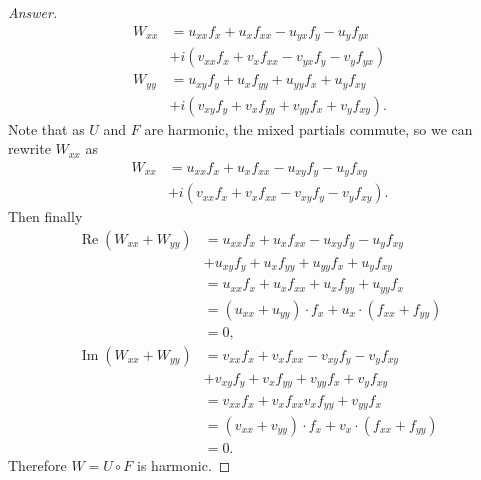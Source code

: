 \documentclass[12pt]{article}
\newcommand\paren[1]{\left( #1 \right)}
\theoremstyle{definition}
\DeclareMathOperator\re{Re}
\DeclareMathOperator\im{Im}
\begin{document}
\begin{proof}[Answer]
\begin{align*}
        W_{xx} & = u_{xx} f_x + u_x f_{xx} - u_{yx} f_y - u_y f_{yx} \\
        & + i \paren{ v_{xx} f_x + v_x f_{xx} - v_{yx} f_y - v_y f_{yx} } \\
        W_{yy} & = u_{xy} f_y + u_x f_{yy} + u_{yy} f_x + u_y f_{xy} \\
        & + i \paren{ v_{xy} f_y + v_x f_{yy} + v_{yy} f_x + v_y f_{xy} }.
    \end{align*}
    Note that as $U$ and $F$ are harmonic, the mixed partials commute, so we can rewrite $W_{xx}$ as
    \begin{align*}
        W_{xx} & = u_{xx} f_x + u_x f_{xx} - u_{xy} f_y - u_y f_{xy} \\
        & + i \paren{ v_{xx} f_x + v_x f_{xx} - v_{xy} f_y - v_y f_{xy} }.
    \end{align*}
    Then finally
    \begin{align*}
        \re \paren{ W_{xx} + W_{yy} } & = u_{xx} f_x + u_x f_{xx} - u_{xy} f_y - u_y f_{xy} \\
        & + u_{xy} f_y + u_x f_{yy} + u_{yy} f_x + u_y f_{xy} \\ 
        & = u_{xx} f_x + u_x f_{xx} + u_x f_{yy} + u_{yy} f_x \\
        & = \paren{ u_{xx} + u_{yy} } \cdot f_x + u_x \cdot \paren{ f_{xx} + f_{yy} } \\
        & = 0, \\
        \im \paren{ W_{xx} + W_{yy} } & = v_{xx} f_x + v_x f_{xx} - v_{xy} f_y - v_y f_{xy} \\
        & + v_{xy} f_y + v_x f_{yy} + v_{yy} f_x + v_y f_{xy} \\
        & = v_{xx} f_x + v_x f_{xx} v_x f_{yy} + v_{yy} f_x \\
        & = \paren{ v_{xx} + v_{yy} } \cdot f_x + v_x \cdot \paren{ f_{xx} + f_{yy} } \\
        & = 0.
    \end{align*}
    Therefore $W = U \circ F$ is harmonic.
\end{proof}
\end{document}
